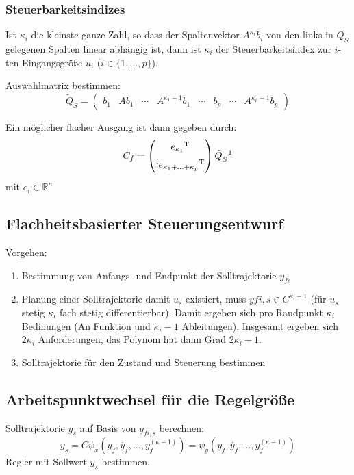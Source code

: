\subsubsection{Steuerbarkeitsindizes}
Ist $\kappa_i$ die kleinste ganze Zahl, so dass der Spaltenvektor $A^{\kappa_i} b_i$
von den links in $Q_S$ gelegenen Spalten linear abhängig ist, dann ist $\kappa_i$ der
Steuerbarkeitsindex zur $i$-ten Eingangsgröße $u_i$ ($i \in \{1, \ldots, p\}$).

Auswahlmatrix bestimmen:
\begin{equation}
    \tilde{Q}_S = \begin{pmatrix}
            b_1 & A b_1 & \cdots & A^{\kappa_1-1}b_1 & \cdots & b_p & \cdots &
                A^{\kappa_p-1} b_p
        \end{pmatrix}
\end{equation}

Ein möglicher flacher Ausgang ist dann gegeben durch:
\begin{equation}
    C_f = \begin{pmatrix} {e_{\kappa_1}}^\text{T} \\ \vdots {e_{\kappa_1 + \ldots + \kappa_p}}^\text{T} \end{pmatrix}
        {\tilde{Q}_S}^{-1}
\end{equation}
mit $e_i \in \mathbb{R}^n$

\subsection{Flachheitsbasierter Steuerungsentwurf}
Vorgehen:
\begin{enumerate}
    \item Bestimmung von Anfangs- und Endpunkt der Solltrajektorie $y_{fs}$
    \item Planung einer Solltrajektorie damit $u_s$ existiert, muss $y{fi,s} \in C^{\kappa_i-1}$
        (für $u_s$ stetig $\kappa_i$ fach stetig differentierbar). Damit ergeben sich pro
        Randpunkt $\kappa_i$ Bedinungen (An Funktion und $\kappa_i-1$ Ableitungen). Insgesamt
        ergeben sich $2 \kappa_i$ Anforderungen, das Polynom hat dann Grad $2 \kappa_i - 1$.
    \item Solltrajektorie für den Zustand und Steuerung bestimmen
\end{enumerate}

\subsection{Arbeitspunktwechsel für die Regelgröße}
Solltrajektorie $y_s$ auf Basis von $y_{fi,s}$ berechnen:
\begin{equation}
    y_s = C \psi_x(y_f, \dot{y_f}, \ldots, y_f^{(\kappa-1)})
        = \psi_y(y_f, \dot{y_f}, \ldots, y_f^{(\kappa-1)})
\end{equation}
Regler mit Sollwert $y_s$ bestimmen.

